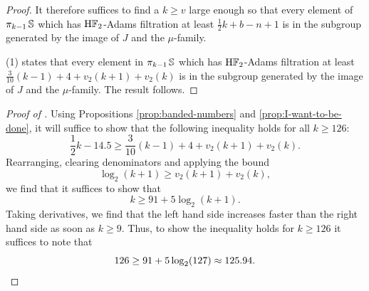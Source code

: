\begin{proof}
  It therefore suffices to find a $k \geq v$ large enough so that every element of $\pi_{k-1} \operatorname{\mathbb{S}}$ which has $\mathrm{H}\mathbb{F}_2$-Adams filtration at least $\frac{1}{2}k + b - n + 1$ is in the subgroup generated by the image of $J$ and the $\mu$-family.
  
  (1) states that every element in $\pi_{k-1} \operatorname{\mathbb{S}}$ which has $\mathrm{H}\mathbb{F}_2$-Adams filtration at least $\frac{3}{10}(k-1)+4+v_2 (k+1) + v_2 (k)$ is in the subgroup generated by the image of $J$ and the $\mu$-family. The result follows.
\end{proof}

\begin{proof}[Proof of ]
  Using Propositions \ref{prop:banded-numbers} and \ref{prop:I-want-to-be-done}, it will suffice to show that the following inequality holds for all $k \geq 126$:
  $$ \frac{1}{2}k - 14.5 \geq \frac{3}{10} (k-1) + 4 + v_2 (k+1) + v_2 (k). $$
  Rearranging, clearing denominators and applying the bound
  $$ \log_2(k+1) \geq v_2(k+1)+v_2(k), $$
  we find that it suffices to show that
  $$ k \geq 91 + 5\log_2(k+1). $$
  Taking derivatives, we find that the left hand side increases faster than the right hand side as soon as $k \geq 9$.
  Thus, to show the inequality holds for $k \geq 126$ it suffices to note that
  \[ 126 \geq 91 + 5 \log_2 (127) \approx 125.94. \qedhere\]


\end{proof}





